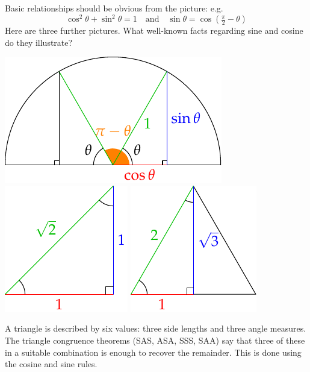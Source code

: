 \begin{example}{}{}
Basic relationships should be obvious from the picture: e.g.
\[\cos^2\theta+\sin^2\theta=1\quad\text{and}\quad\sin\theta=\cos(\tfrac\pi 2-\theta)\]
Here are three further pictures. What well-known facts regarding sine and cosine do they illustrate?
\begin{center}
\includegraphics{angles-trigbasic1}
\qquad
\includegraphics{angles-trigbasic2}
\qquad
\includegraphics{angles-trigbasic3}
\end{center}
\end{example}

\goodbreak



A triangle is described by six values: three side lengths and three angle measures. The triangle congruence theorems (SAS, ASA, SSS, SAA) say that three of these in a suitable combination is enough to recover the remainder. This is done using the cosine and sine rules.

